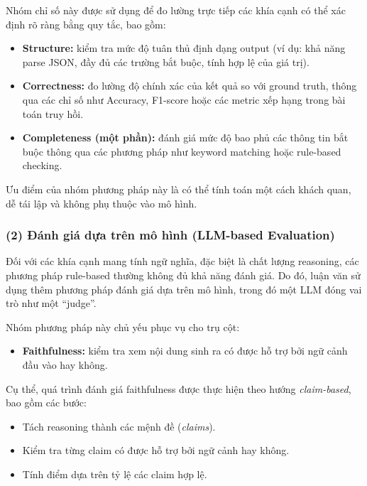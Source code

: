 Nhóm chỉ số này được sử dụng để đo lường trực tiếp các khía cạnh có thể xác định rõ ràng bằng quy tắc, bao gồm:

\begin{itemize}
    \item \textbf{Structure:} kiểm tra mức độ tuân thủ định dạng output (ví dụ: khả năng parse JSON, đầy đủ các trường bắt buộc, tính hợp lệ của giá trị).

    \item \textbf{Correctness:} đo lường độ chính xác của kết quả so với ground truth, thông qua các chỉ số như Accuracy, F1-score hoặc các metric xếp hạng trong bài toán truy hồi.

    \item \textbf{Completeness (một phần):} đánh giá mức độ bao phủ các thông tin bắt buộc thông qua các phương pháp như keyword matching hoặc rule-based checking.
\end{itemize}

Ưu điểm của nhóm phương pháp này là có thể tính toán một cách khách quan, dễ tái lập và không phụ thuộc vào mô hình.

\subsubsection*{(2) Đánh giá dựa trên mô hình (LLM-based Evaluation)}

Đối với các khía cạnh mang tính ngữ nghĩa, đặc biệt là chất lượng reasoning, các phương pháp rule-based thường không đủ khả năng đánh giá. Do đó, luận văn sử dụng thêm phương pháp đánh giá dựa trên mô hình, trong đó một LLM đóng vai trò như một ``judge''.

Nhóm phương pháp này chủ yếu phục vụ cho trụ cột:

\begin{itemize}
    \item \textbf{Faithfulness:} kiểm tra xem nội dung sinh ra có được hỗ trợ bởi ngữ cảnh đầu vào hay không.
\end{itemize}

Cụ thể, quá trình đánh giá faithfulness được thực hiện theo hướng \textit{claim-based}, bao gồm các bước:

\begin{itemize}
    \item Tách reasoning thành các mệnh đề (\textit{claims}).
    \item Kiểm tra từng claim có được hỗ trợ bởi ngữ cảnh hay không.
    \item Tính điểm dựa trên tỷ lệ các claim hợp lệ.
\end{itemize}

